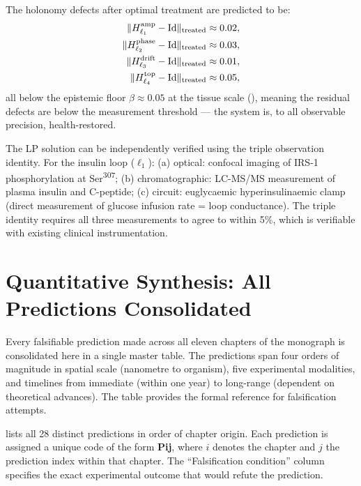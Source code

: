 The holonomy defects after optimal treatment are predicted to be:
\begin{align}
  \|H^{\mathrm{amp}}_{\ell_1} - \mathrm{Id}\|_{\mathrm{treated}} &\approx 0.02, \\
  \|H^{\mathrm{phase}}_{\ell_2} - \mathrm{Id}\|_{\mathrm{treated}} &\approx 0.03, \notag \\
  \|H^{\mathrm{drift}}_{\ell_3} - \mathrm{Id}\|_{\mathrm{treated}} &\approx 0.01, \notag \\
  \|H^{\mathrm{top}}_{\ell_4} - \mathrm{Id}\|_{\mathrm{treated}} &\approx 0.05, \notag
\end{align}
all below the epistemic floor $\beta \approx 0.05$ at the tissue scale
(), meaning the residual defects are below the
measurement threshold — the system is, to all observable precision, health-restored.

\begin{remark}
The LP solution can be independently verified using the triple observation
identity.  For the insulin loop ($\ell_1$): (a) optical: confocal imaging
of IRS-1 phosphorylation at Ser\textsuperscript{307}; (b) chromatographic:
LC-MS/MS measurement of plasma insulin and C-peptide; (c) circuit: euglycaemic
hyperinsulinaemic clamp (direct measurement of glucose infusion rate = loop
conductance).  The triple identity requires all three measurements to agree to
within 5\%, which is verifiable with existing clinical instrumentation.
\end{remark}

\section{Quantitative Synthesis: All Predictions Consolidated}
\label{sec:ch11-all-predictions}

Every falsifiable prediction made across all eleven chapters of the monograph
is consolidated here in a single master table.  The predictions span four
orders of magnitude in spatial scale (nanometre to organism), five experimental
modalities, and timelines from immediate (within one year) to long-range
(dependent on theoretical advances).  The table provides the formal reference
for falsification attempts.

 lists all 28 distinct predictions in order of
chapter origin.  Each prediction is assigned a unique code of the form
\textbf{Pij}, where $i$ denotes the chapter and $j$ the prediction index
within that chapter.  The ``Falsification condition'' column specifies the
exact experimental outcome that would refute the prediction.

